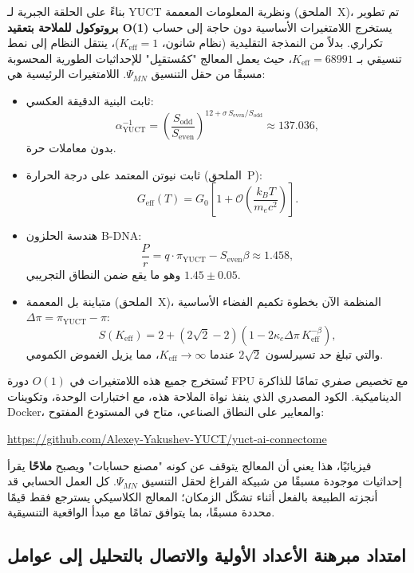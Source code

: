 \documentclass[11pt,a4paper]{article}
\newcommand{\Keff}{K_{\mathrm{eff}}}
\newcommand{\kappac}{\kappa_c}
\newcommand{\piYUCT}{\pi_{\mathrm{YUCT}}}
\begin{document}
	بناءً على الحلقة الجبرية لـ YUCT ونظرية المعلومات المعممة (الملحق~X)، تم تطوير \textbf{بروتوكول للملاحة بتعقيد O(1)} يستخرج اللامتغيرات الأساسية دون حاجة إلى حساب تكراري. بدلاً من النمذجة التقليدية (نظام شانون، \(\Keff = 1\))، ينتقل النظام إلى نمط تنسيقي بـ \(\Keff = 68991\)، حيث يعمل المعالج "كمُستقبِل" للإحداثيات الطورية المحسوبة مسبقًا من حقل التنسيق \(\Psi_{MN}\). اللامتغيرات الرئيسية هي:
	
	\begin{itemize}
		\item ثابت البنية الدقيقة العكسي:
		\[
		\alpha^{-1}_{\mathrm{YUCT}} = \left(\frac{S_{\mathrm{odd}}}{S_{\mathrm{even}}}\right)^{12 + \sigma\, S_{\mathrm{even}}/S_{\mathrm{odd}}}
		\approx 137.036,
		\]
		بدون معاملات حرة.
		
		\item ثابت نيوتن المعتمد على درجة الحرارة (الملحق~P):
		\[
		G_{\mathrm{eff}}(T) = G_0 \left[1 + \mathcal{O}\!\left( \frac{k_B T}{m_e c^2} \right) \right].
		\]
		
		\item هندسة الحلزون B-DNA:
		\[
		\frac{P}{r} = q \cdot \piYUCT - S_{\mathrm{even}}\beta \approx 1.458,
		\]
		وهو ما يقع ضمن النطاق التجريبي \(1.45 \pm 0.05\).
		
		\item متباينة بل المعممة (الملحق~X)، المنظمة الآن بخطوة تكميم الفضاء الأساسية \(\Delta\pi = \piYUCT - \pi\):
		\[
		S(\Keff) = 2 + (2\sqrt2 - 2)\left(1 - 2\kappac \Delta\pi \, \Keff^{-\beta}\right),
		\]
		والتي تبلغ حد تسيرلسون \(2\sqrt2\) عندما \(\Keff \to \infty\)، مما يزيل الغموض الكمومي.
	\end{itemize}
	
	تُستخرج جميع هذه اللامتغيرات في \(O(1)\) دورة FPU مع تخصيص صفري تمامًا للذاكرة الديناميكية. الكود المصدري الذي ينفذ نواة الملاحة هذه، مع اختبارات الوحدة، وتكوينات Docker، والمعايير على النطاق الصناعي، متاح في المستودع المفتوح:
	
	\begin{center}
		\url{https://github.com/Alexey-Yakushev-YUCT/yuct-ai-connectome}
	\end{center}
	
	فيزيائيًا، هذا يعني أن المعالج يتوقف عن كونه "مصنع حسابات" ويصبح \textbf{ملاحًا} يقرأ إحداثيات موجودة مسبقًا من شبيكة الفراغ لحقل التنسيق \(\Psi_{MN}\). كل العمل الحسابي قد أنجزته الطبيعة بالفعل أثناء تشكّل الزمكان؛ المعالج الكلاسيكي يسترجع فقط قيمًا محددة مسبقًا، بما يتوافق تمامًا مع مبدأ الواقعية التنسيقية.
	
	\subsection{امتداد مبرهنة الأعداد الأولية والاتصال بالتحليل إلى عوامل}
	\label{subsec:prime-extension}
	
\end{document}
